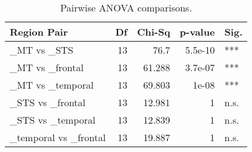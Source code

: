 \begin{table}[h]
\centering
\begin{tabular}{lrrrl}
\toprule
 Region Pair           &   Df &   Chi-Sq &   p-value & Sig.   \\
\midrule
 \_MT vs \_STS           &   13 &   76.7   &   5.5e-10 & ***    \\
 \_MT vs \_frontal       &   13 &   61.288 &   3.7e-07 & ***    \\
 \_MT vs \_temporal      &   13 &   69.803 &   1e-08   & ***    \\
 \_STS vs \_frontal      &   13 &   12.981 &   1       & n.s.   \\
 \_STS vs \_temporal     &   13 &   12.839 &   1       & n.s.   \\
 \_temporal vs \_frontal &   13 &   19.887 &   1       & n.s.   \\
\bottomrule
\end{tabular}
\caption{Pairwise ANOVA comparisons.}
\end{table}